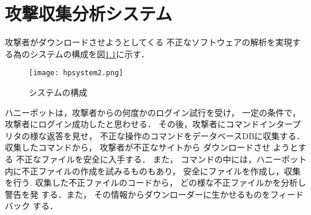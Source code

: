 \documentclass[dvipdfmx]{bta}
\begin{document}
\chapter{攻撃収集分析システム}


攻撃者がダウンロードさせようとしてくる
不正なソフトウェアの解析を実現する為のシステムの構成を図\ref{fig:system}に示す．

\begin{figure}[htbp]
	\centering
 	\texttt{[image: hpsystem2.png]}
 	\caption{システムの構成}\label{fig:system}
\end{figure}






ハニーポットは，攻撃者からの何度かのログイン試行を受け，
一定の条件で，攻撃者にログイン成功したと思わせる．
その後，攻撃者にコマンドインタープリタの様な返答を見せ，
不正な操作のコマンドをデータベースDBに収集する．
% 
収集したコマンドから，
攻撃者が不正なサイトから
ダウンロードさせ
ようとする
不正なファイルを安全に入手する．
また，
コマンドの中には，ハニーポット内に不正ファイルの作成を試みるものもあり，
安全にファイルを作成し，収集を行う.
% 
収集した不正ファイルのコードから，
どの様な不正ファイルかを分析し警告を発
する．また，
その情報からダウンローダーに生かせるものをフィードバック
する．
% 
\end{document}
